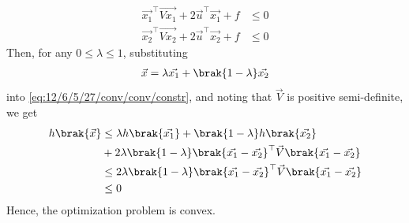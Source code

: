 \begin{enumerate}[label=\thechapter.\arabic*,ref=\thechapter.\theenumi]
    \begin{align}
        \vec{x_1}^\top\vec{Vx_1} + 2\vec{u}^\top\vec{x_1} + f &\le 0 \\
        \vec{x_2}^\top\vec{Vx_2} + 2\vec{u}^\top\vec{x_2} + f &\le 0 
    \end{align}
    Then, for any $0 \le \lambda \le 1$, substituting
    \begin{align}
	    \vec{x} = \lambda\vec{x_1} + \brak{1-\lambda}\vec{x_2}
    \end{align}
    into \eqref{eq:12/6/5/27/conv/conv/constr}, and noting that $\vec{V}$ is positive semi-definite, 
    we get
    \begin{align}
        h\brak{\vec{x}} &\le \lambda h\brak{\vec{x_1}} + \brak{1-\lambda}h\brak{\vec{x_2}} \nonumber \\
                                &+ 2\lambda\brak{1-\lambda}\brak{\vec{x_1}-\vec{x_2}}^\top\vec{V}\brak{\vec{x_1}-\vec{x_2}} \\
                                &\le 2\lambda\brak{1-\lambda}\brak{\vec{x_1}-\vec{x_2}}^\top\vec{V}\brak{\vec{x_1}-\vec{x_2}} \\
                                &\le 0
        \label{eq:12/6/5/27/conv/conv/convex}
    \end{align}
    Hence, the optimization problem is convex. 

\end{enumerate}

